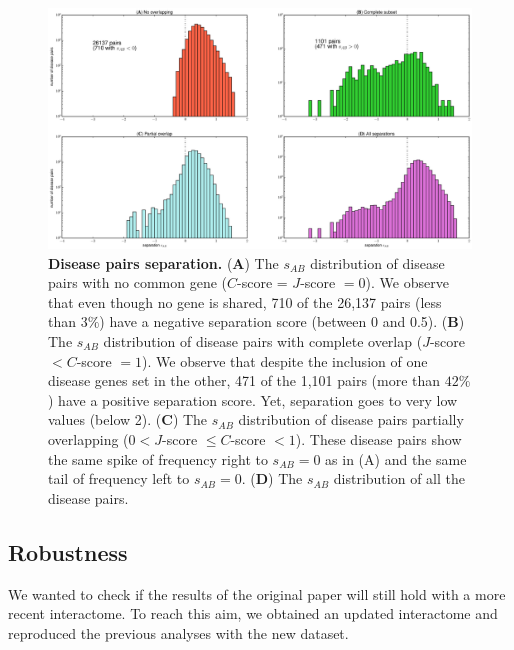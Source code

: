 \documentclass[letterpaper]{article}
\begin{document}
		\begin{figure}[!t]
			\hspace{-1.8cm}
			\vspace{-1cm}
			\includegraphics[scale=.35]{images/s_AB_histograms.eps}
			\caption{\label{fig:s_AB histogram}
			{\bf Disease pairs separation.}
			({\bf A}) The $s_{AB}$ distribution of disease pairs with no common gene ($C$-score = $J$-score $= 0$). We
			observe that even though no gene is shared, 710 of the 26,137 pairs (less than $3\%$) have a negative
			separation score (between 0 and 0.5).
			({\bf B}) The $s_{AB}$ distribution of disease pairs with complete overlap ($J$-score $< C$-score $= 1$).
			We observe that despite the inclusion of one disease genes set in the other, 471 of the 1,101 pairs
			(more than $42\%$) have a positive separation score. Yet, separation goes to very low values (below 2).
			({\bf C}) The $s_{AB}$ distribution of disease pairs partially overlapping ($0 < J$-score $ \leq C$-score $< 1$).
			These disease pairs show the same spike of frequency right to $s_{AB} = 0$ as in (A) and the same tail of frequency
			left to $s_{AB} = 0$.
			({\bf D}) The $s_{AB}$ distribution of all the disease pairs.
			}
		\end{figure}

	\subsection{Robustness}
	We wanted to check if the results of the original paper will still hold with a more recent interactome.
	To reach this aim, we obtained an updated interactome and reproduced the previous analyses with the
	new dataset.
\end{document}
